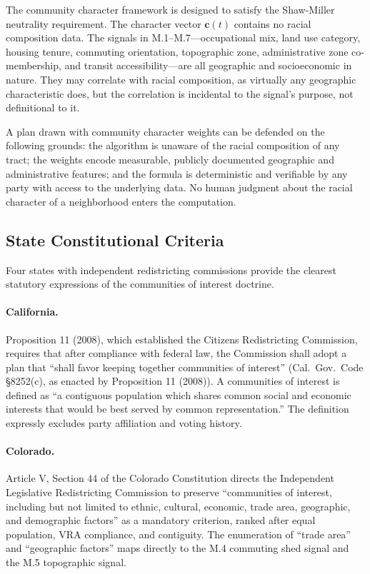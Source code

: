 The community character framework is designed to satisfy the Shaw-Miller neutrality
requirement.
The character vector $\mathbf{c}(t)$ contains no racial composition data.
The signals in M.1--M.7---occupational mix, land use category, housing tenure,
commuting orientation, topographic zone, administrative zone co-membership,
and transit accessibility---are all geographic and socioeconomic in nature.
They may correlate with racial composition, as virtually any geographic characteristic
does, but the correlation is incidental to the signal's purpose, not definitional to it.

A plan drawn with community character weights can be defended on the following grounds:
the algorithm is unaware of the racial composition of any tract; the weights encode
measurable, publicly documented geographic and administrative features; and the formula
is deterministic and verifiable by any party with access to the underlying data.
No human judgment about the racial character of a neighborhood enters the computation.

\subsection{State Constitutional Criteria}

Four states with independent redistricting commissions provide the clearest statutory
expressions of the communities of interest doctrine.

\paragraph{California.}
Proposition 11 (2008), which established the Citizens Redistricting Commission,
requires that after compliance with federal law, the Commission shall adopt a
plan that ``shall favor keeping together communities of interest''
(Cal.\ Gov.\ Code \S 8252(c), as enacted by Proposition 11 (2008)).
A communities of interest is defined as ``a contiguous population which shares common
social and economic interests that would be best served by common representation.''
The definition expressly excludes party affiliation and voting history.

\paragraph{Colorado.}
Article V, Section 44 of the Colorado Constitution directs the Independent Legislative
Redistricting Commission to preserve ``communities of interest, including but not
limited to ethnic, cultural, economic, trade area, geographic, and demographic
factors'' as a mandatory criterion, ranked after equal population, VRA compliance,
and contiguity.
The enumeration of ``trade area'' and ``geographic factors'' maps directly to the
M.4 commuting shed signal and the M.5 topographic signal.

